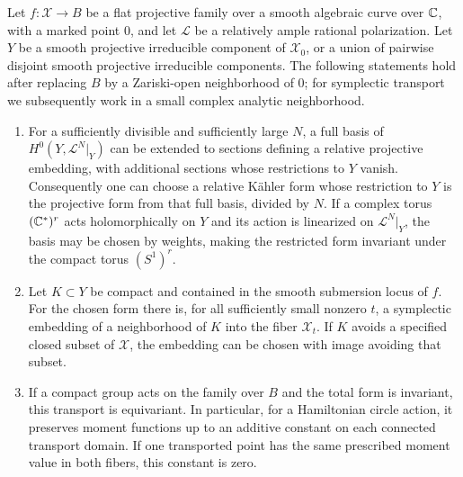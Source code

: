 \begin{lemma}\label{geo:projective-transfer}
Let \(f:\mathcal X\to B\) be a flat projective family over a
smooth algebraic curve over \(\mathbb C\), with a marked point \(0\), and let
\(\mathcal L\) be a relatively ample rational polarization.
Let \(Y\) be a smooth projective irreducible component of
\(\mathcal X_0\), or a union of pairwise disjoint smooth projective
irreducible components.
The following statements hold after replacing \(B\)
by a Zariski-open neighborhood of \(0\); for symplectic transport
we subsequently work in a small complex analytic neighborhood.
\begin{enumerate}
\item For a sufficiently divisible and sufficiently large \(N\),
a full basis of
\(H^0(Y,\mathcal L^N|_Y)\) can be extended to sections defining a
relative projective embedding, with additional sections whose
restrictions to \(Y\) vanish. Consequently one can choose a
relative K\"ahler form whose restriction to \(Y\) is the
projective form from that full basis, divided by \(N\).
If a complex torus \((\mathbb C^*)^r\) acts holomorphically on \(Y\) and its action is
linearized on \(\mathcal L^N|_Y\), the basis may be chosen by
weights, making the restricted form invariant under the compact torus
\((S^1)^r\).
\item Let \(K\subset Y\) be compact and contained in the smooth
submersion locus of \(f\). For the chosen form there is, for all
sufficiently small nonzero \(t\), a symplectic embedding of a
neighborhood of \(K\) into the fiber \(\mathcal X_t\).
If \(K\) avoids a specified closed subset of \(\mathcal X\),
the embedding can be chosen with image avoiding that subset.
\item If a compact group acts on the family over \(B\) and the
total form is invariant, this transport is equivariant.
In particular, for a Hamiltonian circle action, it preserves
moment functions up to an additive constant on each connected
transport domain. If one transported point has the same prescribed
moment value in both fibers, this constant is zero.
\end{enumerate}
\end{lemma}

